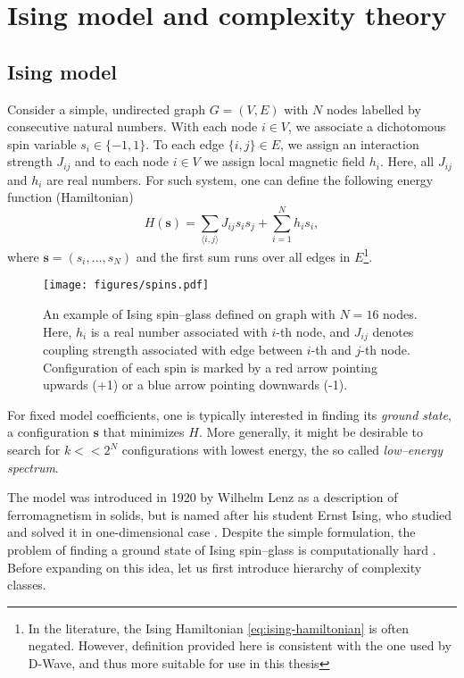 \chapter{Ising model and complexity theory}

\section{Ising model}
Consider a simple, undirected graph $G = (V, E)$ with $N$ nodes labelled by consecutive natural numbers. With each node $i \in V$, we associate a dichotomous spin variable $s_i \in \{-1, 1\}$. To each edge $\{i, j\} \in E$, we assign an interaction strength $J_{ij}$ and to each node $i \in V$ we assign local magnetic field $h_i$. Here, all $J_{ij}$ and $h_i$ are real numbers. For such system, one can define the following energy function (Hamiltonian)
\begin{equation}
\label{eq:ising-hamiltonian}
H(\mathbf{s}) = \sum_{\langle i, j \rangle} J_{ij} s_i s_j +  \sum_{i=1}^N h_i s_i,
\end{equation}
where $\mathbf{s} = (s_i, \ldots, s_N)$ and the first sum runs over all edges in $E$\footnote{In the literature, the Ising Hamiltonian \eqref{eq:ising-hamiltonian} is often negated. However, definition provided here is consistent with the one used by D-Wave, and thus more suitable for use in this thesis}.
\begin{figure}
    \centering
    \texttt{[image: figures/spins.pdf]}
    \caption{An example of Ising  spin--glass defined on graph with $N=16$ nodes. Here, $h_i$ is a real number associated with $i$-th node, and $J_{ij}$ denotes coupling strength associated with edge between $i$-th and $j$-th node. Configuration of each spin is marked by a red arrow pointing upwards (+1) or a blue arrow pointing downwards (-1).}
    \label{fig:my_label}
\end{figure}
For fixed model coefficients, one is typically interested in finding its \emph{ground state}, a configuration $\mathbf{s}$ that minimizes $H$. More generally, it might be desirable to search for $k << 2^N$ configurations with lowest energy, the so called \emph{low--energy spectrum}.

The model was introduced in 1920 by Wilhelm Lenz \cite{lenz} as a description of ferromagnetism in solids, but is named after his student Ernst Ising, who studied and solved it in one-dimensional case \cite{ising}.  Despite the simple formulation, the problem of finding a ground state of Ising spin--glass is computationally hard \cite{barahoma}. Before expanding on this idea, let us first introduce hierarchy of complexity classes.

